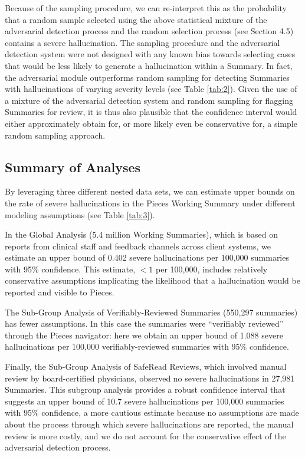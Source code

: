\documentclass{style/myclass}
\begin{document}
Because of the sampling procedure, we can re-interpret this as the probability that a random sample selected using the above statistical mixture of the adversarial detection process and the random selection process (see Section 4.5) contains a severe hallucination. The sampling procedure and the adversarial detection system were not designed with any known bias towards selecting cases that would be less likely to generate a hallucination within a Summary. In fact, the adversarial module outperforms random sampling for detecting Summaries with hallucinations of varying severity levels (see Table \ref{tab:2}). Given the use of a mixture of the adversarial detection system and random sampling for flagging Summaries for review, it is thus also plausible that the confidence interval would either approximately obtain for, or more likely even be conservative for, a simple random sampling approach.

\subsection{Summary of Analyses}

By leveraging three different nested data sets, we can estimate upper bounds on the rate of severe hallucinations in the Pieces Working Summary under different modeling assumptions (see Table \ref{tab:3}).

In the Global Analysis (5.4 million Working Summaries), which is based on reports from clinical staff and feedback channels across client systems, we estimate an upper bound of 0.402 severe hallucinations per 100,000 summaries with 95\% confidence. This estimate, $<1$ per 100,000, includes relatively conservative assumptions implicating the likelihood that a hallucination would be reported and visible to Pieces.

The Sub-Group Analysis of Verifiably-Reviewed Summaries (550,297 summaries) has fewer assumptions. In this case the summaries were “verifiably reviewed” through the Pieces navigator: here we obtain an upper bound of 1.088 severe hallucinations per 100,000 verifiably-reviewed summaries with 95\% confidence.

Finally, the Sub-Group Analysis of SafeRead Reviews, which involved manual review by board-certified physicians, observed no severe hallucinations in 27,981 Summaries. This subgroup analysis provides a robust confidence interval that suggests an upper bound of 10.7 severe hallucinations per 100,000 summaries with 95\% confidence, a more cautious estimate because no assumptions are made about the process through which severe hallucinations are reported, the manual review is more costly, and we do not account for the conservative effect of the adversarial detection process.
\end{document}

